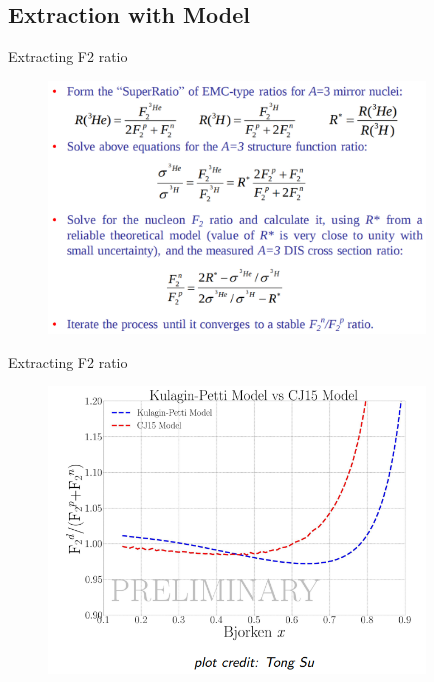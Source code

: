 \documentclass{beamer}
\begin{document}
\fi

\subsection[Extraction with Model]{Extraction with Model}
\begin{frame}{Extracting F2 ratio}

\begin{figure}
	\includegraphics[width=10cm]{../images/f2ext.png}
\end{figure}
\end{frame}

\begin{frame}{Extracting F2 ratio}
\vspace{-10pt}
\begin{figure}
	\includegraphics[width=10cm]{../images/kp_cj.png}
\end{figure}
\end{frame}
\end{document}
